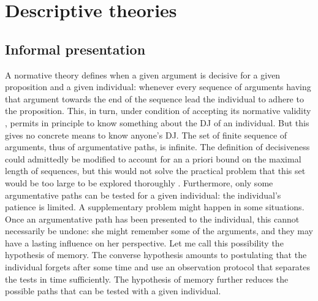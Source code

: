 \documentclass[version=last, pagesize, twoside=off, bibliography=totoc, DIV=calc, fontsize=12pt, a4paper, french, english]{scrartcl}
\begin{document}
\section{Descriptive theories}
\label{sec:descriptive}
\subsection{Informal presentation}
A normative theory defines when a given argument is decisive for a given proposition and a given individual: whenever every sequence of arguments having that argument towards the end of the sequence lead the individual to adhere to the proposition. This, in turn, under condition of accepting its normative validity , permits in principle to know something about the \ac{DJ} of an individual. But this gives no concrete means to know anyone’s \ac{DJ}. The set of finite sequence of arguments, thus of argumentative paths, is infinite. The definition of decisiveness could admittedly be modified to account for an a priori bound on the maximal length of sequences, but this would not solve the practical problem that this set would be too large to be explored thoroughly 
. 
Furthermore, only some argumentative paths can be tested for a given individual: the individual’s patience is limited. A supplementary problem might happen in some situations. Once an argumentative path has been presented to the individual, this cannot necessarily be undone: she might remember some of the arguments, and they may have a lasting influence on her perspective. Let me call this possibility the hypothesis of memory.
The converse hypothesis amounts to postulating that the individual forgets after some time and use an observation protocol that separates the tests in time sufficiently.
The hypothesis of memory further reduces the possible paths that can be tested with a given individual.
\end{document}
